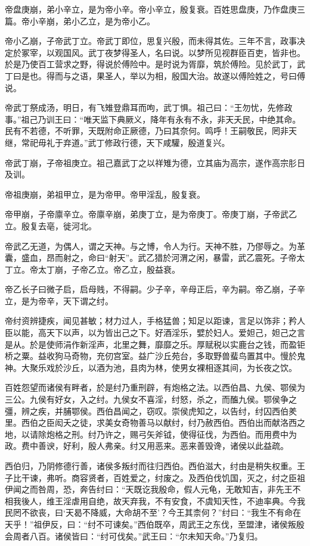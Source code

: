 \documentclass[UTF8,12pt,AutoFakeBold,fontset=fandol]{ctexart}
\begin{document}
	帝盘庚崩，弟小辛立，是为帝小辛。帝小辛立，殷复衰。百姓思盘庚，乃作盘庚三篇。帝小辛崩，弟小乙立，是为帝小乙。
	
	帝小乙崩，子帝武丁立。帝武丁即位，思复兴殷，而未得其佐。三年不言，政事决定於冢宰，以观国风。武丁夜梦得圣人，名曰说。以梦所见视群臣百吏，皆非也。於是乃使百工营求之野，得说於傅险中。是时说为胥靡，筑於傅险。见於武丁，武丁曰是也。得而与之语，果圣人，举以为相，殷国大治。故遂以傅险姓之，号曰傅说。
		
	帝武丁祭成汤，明日，有飞雉登鼎耳而呴，武丁惧。祖己曰：“王勿忧，先修政事。”祖己乃训王曰：“唯天监下典厥义，降年有永有不永，非天夭民，中绝其命。民有不若德，不听罪，天既附命正厥德，乃曰其奈何。鸣呼！王嗣敬民，罔非天继，常祀毋礼于弃道。”武丁修政行德，天下咸驩，殷道复兴。
	
	帝武丁崩，子帝祖庚立。祖己嘉武丁之以祥雉为德，立其庙为高宗，遂作高宗肜日及训。
	
	帝祖庚崩，弟祖甲立，是为帝甲。帝甲淫乱，殷复衰。
	
	帝甲崩，子帝廪辛立。帝廪辛崩，弟庚丁立，是为帝庚丁。帝庚丁崩，子帝武乙立。殷复去亳，徙河北。
	
	帝武乙无道，为偶人，谓之天神。与之博，令人为行。天神不胜，乃僇辱之。为革囊，盛血，昂而射之，命曰“射天”。武乙猎於河渭之闲，暴雷，武乙震死。子帝太丁立。帝太丁崩，子帝乙立。帝乙立，殷益衰。
	
	帝乙长子曰微子启，启母贱，不得嗣。少子辛，辛母正后，辛为嗣。帝乙崩，子辛立，是为帝辛，天下谓之纣。
	
	帝纣资辨捷疾，闻见甚敏；材力过人，手格猛兽；知足以距谏，言足以饰非；矜人臣以能，高天下以声，以为皆出己之下。好酒淫乐，嬖於妇人。爱妲己，妲己之言是从。於是使师涓作新淫声，北里之舞，靡靡之乐。厚赋税以实鹿台之钱，而盈钜桥之粟。益收狗马奇物，充仞宫室。益广沙丘苑台，多取野兽蜚鸟置其中。慢於鬼神。大聚乐戏於沙丘，以酒为池，县肉为林，使男女裸相逐其间，为长夜之饮。
	
	百姓怨望而诸侯有畔者，於是纣乃重刑辟，有炮格之法。以西伯昌、九侯、鄂侯为三公。九侯有好女，入之纣。九侯女不喜淫，纣怒，杀之，而醢九侯。鄂侯争之彊，辨之疾，并脯鄂侯。西伯昌闻之，窃叹。崇侯虎知之，以告纣，纣囚西伯羑里。西伯之臣闳夭之徒，求美女奇物善马以献纣，纣乃赦西伯。西伯出而献洛西之地，以请除炮格之刑。纣乃许之，赐弓矢斧钺，使得征伐，为西伯。而用费中为政。费中善谀，好利，殷人弗亲。纣又用恶来。恶来善毁谗，诸侯以此益疏。
	
	西伯归，乃阴修德行善，诸侯多叛纣而往归西伯。西伯滋大，纣由是稍失权重。王子比干谏，弗听。商容贤者，百姓爱之，纣废之。及西伯伐饥国，灭之，纣之臣祖伊闻之而咎周，恐，奔告纣曰：“天既讫我殷命，假人元龟，无敢知吉，非先王不相我後人，维王淫虐用自绝，故天弃我，不有安食，不虞知天性，不迪率典。今我民罔不欲丧，曰‘天曷不降威，大命胡不至’？今王其柰何？”纣曰：“我生不有命在天乎！”祖伊反，曰：“纣不可谏矣。”西伯既卒，周武王之东伐，至盟津，诸侯叛殷会周者八百。诸侯皆曰：“纣可伐矣。”武王曰：“尔未知天命。”乃复归。
	
\end{document}
